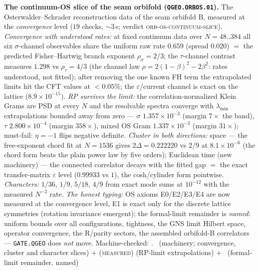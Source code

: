 \par\smallskip\noindent\textbf{The continuum-OS slice of the seam
orbifold (\texttt{QGEO.ORBOS.01}).}
The Osterwalder--Schrader reconstruction data of the seam orbifold B,
measured at the \emph{convergence} level ($19$ checks, ${\sim}3$\,s;
verdict \textsc{orb-os-continuum-slice}).  \emph{Convergence with
understood rates:} at fixed continuum data over $N=48..384$ all six
$\sigma$-channel observables share the uniform raw rate $0.659$
(spread $0.020$) $=$ the predicted Fisher--Hartwig branch exponent
$\rho_\sigma=2/3$; the $\tau$-channel contrast measures $1.298$ vs
$\rho_\tau=4/3$ (the channel law $\rho=2(1-\beta)^2-2\beta^2$: rates
understood, not fitted); after removing the one known FH term the
extrapolated limits hit the CFT values at $<0.05\%$; the
$\varepsilon$/current channel is exact on the lattice
($8.9\times10^{-15}$).  \emph{RP survives the limit:} the
correlation-normalized Klein Grams are PSD at every $N$ and the
resolvable spectra converge with $\lambda_{\min}$ extrapolations
bounded away from zero --- $\sigma$ $1.357\times10^{-3}$ (margin
$7\times$ the band), $\tau$ $2.800\times10^{-4}$ (margin $358\times$),
mixed OS Gram $1.337\times10^{-3}$ (margin $31\times$); must-fail:
$\eta=-1$ flips negative definite.  \emph{Cluster in both
directions:} space --- the free-exponent chord fit at $N=1536$ gives
$2\Delta=0.222220$ vs $2/9$ at $8.1\times10^{-6}$ (the chord form
beats the plain power law by five orders); Euclidean time (new
machinery) --- the connected correlator decays with the fitted gap
$=$ the exact transfer-matrix $\varepsilon$ level ($0.99933$ vs $1$),
the cosh/cylinder form pointwise.  \emph{Characters:} $1/36$, $1/9$,
$5/18$, $4/9$ from exact mode sums at $10^{-12}$ with the measured
$N^{-2}$ rate.  \emph{The honest typing:} OS axioms E0/E2/E3/E4 are
now measured at the convergence level, E1 is exact only for the
discrete lattice symmetries (rotation invariance emergent); the
formal-limit remainder is \emph{named}: uniform bounds over all
configurations, tightness, the GNS limit Hilbert space, operator
convergence, the R/parity sectors, the assembled orbifold-B
correlators --- \texttt{GATE.QGEO} does \emph{not} move.
Machine-checked: .
\mE\ (machinery; convergence, cluster and character slices) $+$
(\textsc{measured}) (RP-limit extrapolations) $+$ \mC\ (formal-limit
remainder, named)
\par\smallskip

